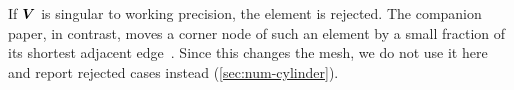 If $\bm{V}$ is singular to working precision, the element is rejected. The companion paper, in contrast, moves a corner node of such an element by a small fraction of its shortest adjacent edge~\cite{Eisentraeger2026axisymmetric}. Since this changes the mesh, we do not use it here and report rejected cases instead (\cref{sec:num-cylinder}).
